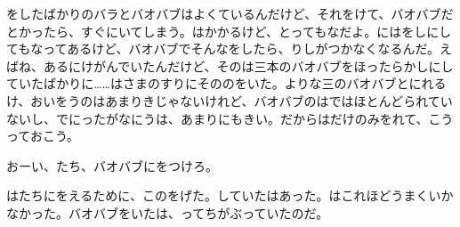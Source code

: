 をしたばかりのバラとバオバブはよくているんだけど、それをけて、バオバブだとかったら、すぐにいてしまう。はかかるけど、とってもなだよ。にはをしにしてもなってあるけど、バオバブでそんなをしたら、りしがつかなくなるんだ。えばね、あるにけがんでいたんだけど、そのは三本のバオバブをほったらかしにしていたばかりに……はさまのすりにそののをいた。よりな三のバオバブとにれるけ、おいをうのはあまりきじゃないけれど、バオバブのはではほとんどられていないし、でにったがなにうは、あまりにもきい。だからはだけのみをれて、こうっておこう。

おーい、たち、バオバブにをつけろ。

はたちにをえるために、このをげた。していたはあった。はこれほどうまくいかなかった。バオバブをいたは、ってちがぶっていたのだ。


